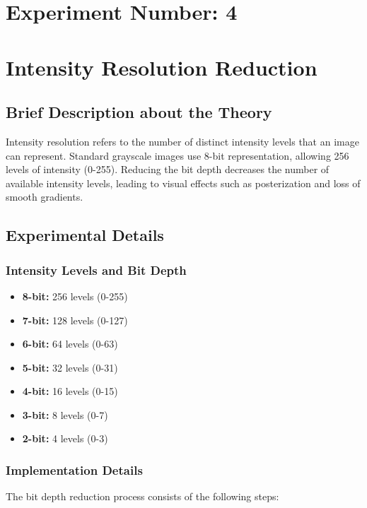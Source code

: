 \documentclass[12pt,a4paper]{article}
\begin{document}
\newpage
\section*{Experiment Number: 4}
\section{Intensity Resolution Reduction}

\subsection{Brief Description about the Theory}
Intensity resolution refers to the number of distinct intensity levels that an image can represent. Standard grayscale images use 8-bit representation, allowing 256 levels of intensity (0-255). Reducing the bit depth decreases the number of available intensity levels, leading to visual effects such as posterization and loss of smooth gradients.

\subsection{Experimental Details}
\subsubsection{Intensity Levels and Bit Depth}
\begin{itemize}
  \item \textbf{8-bit:} 256 levels (0-255)
  \item \textbf{7-bit:} 128 levels (0-127)
  \item \textbf{6-bit:} 64 levels (0-63)
  \item \textbf{5-bit:} 32 levels (0-31)
  \item \textbf{4-bit:} 16 levels (0-15)
  \item \textbf{3-bit:} 8 levels (0-7)
  \item \textbf{2-bit:} 4 levels (0-3)
\end{itemize}

\subsubsection{Implementation Details}
The bit depth reduction process consists of the following steps:
\end{document}
